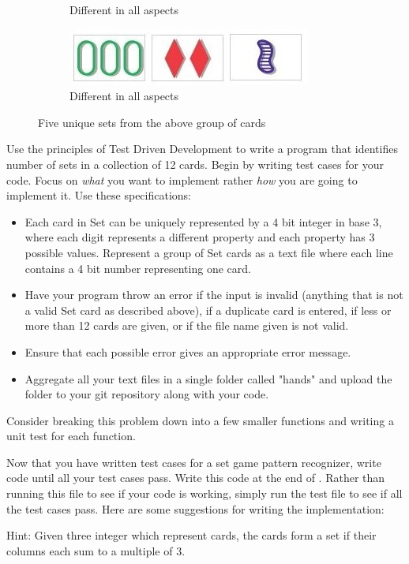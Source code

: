 \begin{problem}
\begin{figure}[H]
\begin{subfigure}{.47\textwidth}
    \caption{Different in all aspects}
    \label{fig:labeltheotherfigure}
\end{subfigure}
\begin{subfigure}{.48\textwidth}
    \centering
    \includegraphics[width=\linewidth]{set5.jpg}
    \caption{Different in all aspects}
    \label{fig:labeltheotherfigure}
\end{subfigure}
\caption{Five unique sets from the above group of cards}
\end{figure}


\vspace{5mm}

Use the principles of Test Driven Development to write a program that identifies number of sets in a collection of 12 cards. Begin by writing test cases for your code. Focus on \textit{what} you want to implement rather \textit{how} you are going to implement it. Use these specifications:
\begin{itemize}
\item Each card in Set can be uniquely represented by a 4 bit integer in base 3, where each digit represents a different property and each property has 3 possible values. Represent a group of Set cards as a text file where each line contains a 4 bit number representing one card.
\item Have your program throw an error if the input is invalid (anything that is not a valid Set card as described above),  if a duplicate card is entered, if less or more than 12 cards are given, or if the file name given is not valid.
\item Ensure that each possible error gives an appropriate error message.
\item Aggregate all your text files in a single folder called "hands" and upload the folder to your git repository along with your code.
\end{itemize}

Consider breaking this problem down into a few smaller functions and writing a unit test for each function.

\end{problem}

\begin{problem}
Now that you have written test cases for a set game pattern recognizer, write code until all your test cases pass. Write this code at the end of . Rather than running this file to see if your code is working, simply run the test file to see if all the test cases pass. Here are some suggestions for writing the implementation:

Hint: Given three integer which represent cards, the cards form a set if their columns each sum to a multiple of 3.

\end{problem}

